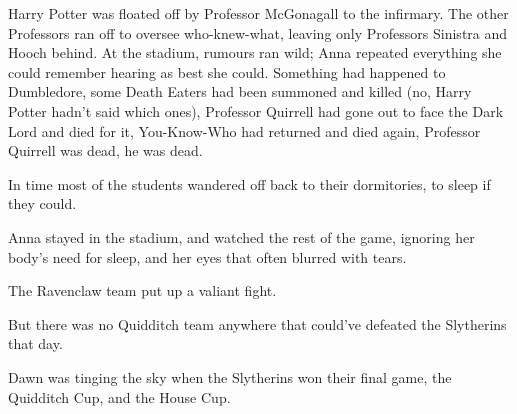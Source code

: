 Harry Potter was floated off by Professor McGonagall to the infirmary. The
other Professors ran off to oversee who-knew-what, leaving only Professors
Sinistra and Hooch behind. At the stadium, rumours ran wild; Anna repeated
everything she could remember hearing as best she could. Something had happened
to Dumbledore, some Death Eaters had been summoned and killed (no, Harry Potter
hadn't said which ones), Professor Quirrell had gone out to face the Dark Lord
and died for it, You-Know-Who had returned and died again, Professor Quirrell
was dead, he was dead.

In time most of the students wandered off back to their dormitories, to sleep
if they could.

Anna stayed in the stadium, and watched the rest of the game, ignoring her
body's need for sleep, and her eyes that often blurred with tears.

The Ravenclaw team put up a valiant fight.

But there was no Quidditch team anywhere that could've defeated the Slytherins
that day.

Dawn was tinging the sky when the Slytherins won their final game, the
Quidditch Cup, and the House Cup.
